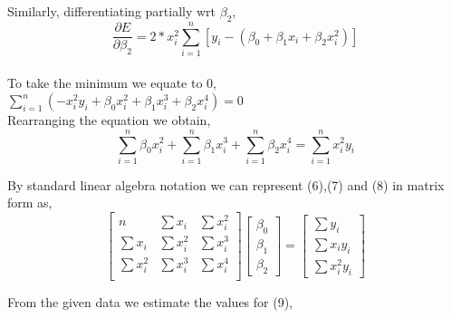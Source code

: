 \documentclass{scrartcl}
\begin{document}
Similarly, differentiating partially wrt $\beta_{2}$,\\

$$ \frac{\partial E}{\partial \beta_{2}}=2*x_i^2\sum_{i=1}^{n} [y_{i}-(\beta_{0}+\beta_{1}x_{i}+\beta_2x_i^2)]$$\\

To take the minimum we equate to 0,\\

$ \sum_{i=1}^{n}(-x_{i}^2y_{i}+\beta_{0}x_{i}^2+\beta_{1}x_i^3+\beta_2x_i^4)=0$\\

Rearranging the equation we obtain,\\
\begin{equation}
\sum_{i=1}^{n}\beta_{0}x_{i}^2+\sum_{i=1}^{n}\beta_{1}x_i^3+\sum_{i=1}^{n}\beta_{2}x_i^4=\sum_{i=1}^{n}x_i^2y_{i}
\end{equation}

By standard linear algebra notation we can represent (6),(7) and (8) in matrix form as,\\
\begin{equation}
    \begin{bmatrix} n & \sum x_{i} & \sum x_{i}^{2}\\
    \sum x_{i} & \sum x_{i}^{2} & \sum x_i^3\\
    \sum x_{i}^2 & \sum x_{i}^{3} & \sum x_i^4\\
    \end{bmatrix}
\begin{bmatrix} \beta_{0}\\ \beta_{1}\\ \beta_{2} \end{bmatrix} 
= \begin{bmatrix} \sum y_{i}\\ \sum x_{i}y_i \\ \sum x_{i}^2y_i \end{bmatrix}
\end{equation}

From the given data we estimate the values for (9),\\
\end{document}
